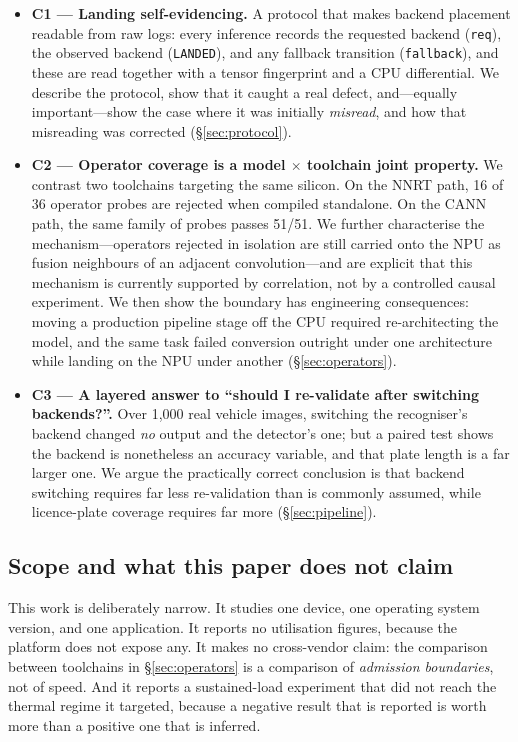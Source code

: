 \documentclass[conference]{IEEEtran}
\newcommand{\landed}{\texttt{LANDED}}
\newcommand{\reqf}{\texttt{req}}
\newcommand{\fbf}{\texttt{fallback}}
\begin{document}
\begin{itemize}
\item \textbf{C1 --- Landing self-evidencing.} A protocol that makes backend
placement readable from raw logs: every inference records the requested backend
(\reqf), the observed backend (\landed), and any fallback transition (\fbf), and
these are read together with a tensor fingerprint and a CPU differential. We
describe the protocol, show that it caught a real defect, and---equally
important---show the case where it was initially \emph{misread}, and how that
misreading was corrected (\S\ref{sec:protocol}).

\item \textbf{C2 --- Operator coverage is a model $\times$ toolchain joint
property.} We contrast two toolchains targeting the same silicon. On the NNRT
path, 16 of 36 operator probes are rejected when compiled standalone. On the
CANN path, the same family of probes passes 51/51. We further characterise the
mechanism---operators rejected in isolation are still carried onto the NPU as
fusion neighbours of an adjacent convolution---and are explicit that this
mechanism is currently supported by correlation, not by a controlled causal
experiment. We then show the boundary has engineering consequences: moving a
production pipeline stage off the CPU required re-architecting the model, and the
same task failed conversion outright under one architecture while landing on the
NPU under another (\S\ref{sec:operators}).

\item \textbf{C3 --- A layered answer to ``should I re-validate after switching
backends?''.} Over 1{,}000 real vehicle images, switching the recogniser's
backend changed \emph{no} output and the detector's one; but a paired test shows
the backend is nonetheless an accuracy variable, and that plate length is a far
larger one. We argue the practically correct conclusion is that backend
switching requires far less re-validation than is commonly assumed, while
licence-plate coverage requires far more (\S\ref{sec:pipeline}).
\end{itemize}

\subsection{Scope and what this paper does not claim}

This work is deliberately narrow. It studies one device, one operating system
version, and one application. It reports no utilisation figures, because the
platform does not expose any. It makes no cross-vendor claim: the comparison
between toolchains in \S\ref{sec:operators} is a comparison of \emph{admission
boundaries}, not of speed. And it reports a sustained-load experiment that did
not reach the thermal regime it targeted, because a negative result that is
reported is worth more than a positive one that is inferred.
\end{document}
